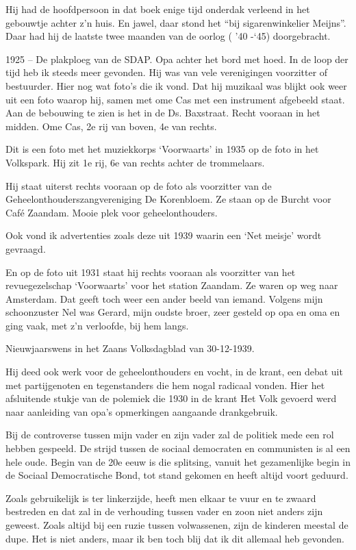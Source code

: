\documentclass[10pt,twoside,openright]{memoir}
\begin{document}
Hij had de hoofdpersoon in dat boek enige tijd onderdak verleend in het gebouwtje achter z’n huis. En jawel, daar stond het “bij sigarenwinkelier Meijns”. Daar had hij de laatste twee maanden van de oorlog ( ’40 -‘45) doorgebracht.

1925 – De plakploeg van de SDAP. Opa achter het bord met hoed.
In de loop der tijd heb ik steeds meer gevonden. Hij was van vele verenigingen voorzitter of bestuurder. Hier nog wat foto’s die ik vond. 
Dat hij muzikaal was blijkt ook weer uit een foto waarop hij, samen met ome Cas met een instrument afgebeeld staat. Aan de bebouwing te zien is het in de Ds. Baxstraat. Recht vooraan in het midden. Ome Cas, 2e rij van boven, 4e van rechts. 

Dit is een foto met het muziekkorps ‘Voorwaarts’ in 1935 op de foto in het Volkspark. Hij zit 1e rij, 6e van rechts achter de trommelaars.

Hij staat uiterst rechts vooraan op de foto als voorzitter van de Geheelonthouderszangvereniging De Korenbloem. Ze staan op de Burcht voor Café Zaandam. Mooie plek voor geheelonthouders.

Ook vond ik advertenties zoals deze uit 1939 waarin 
een ‘Net meisje’ wordt gevraagd.

En op de foto uit 1931 staat hij rechts vooraan als voorzitter van het revuegezelschap ‘Voorwaarts’ voor het station Zaandam. Ze waren op weg naar Amsterdam. Dat geeft toch weer een ander beeld van iemand. Volgens mijn schoonzuster Nel was Gerard, mijn oudste broer, zeer gesteld op opa en oma en ging vaak, met z’n verloofde, bij hem langs. 

Nieuwjaarswens in het Zaans Volksdagblad van 30-12-1939.

Hij deed ook werk voor de geheelonthouders en vocht, in de krant, een debat uit met partijgenoten en tegenstanders die hem nogal radicaal vonden. Hier het afsluitende stukje van de polemiek die 1930 in de krant Het Volk gevoerd werd naar aanleiding van opa’s opmerkingen aangaande drankgebruik. 

Bij de controverse tussen mijn vader en zijn vader zal de politiek mede een rol hebben gespeeld. De strijd tussen de sociaal democraten en communisten is al een hele oude. Begin van de 20e eeuw is die splitsing, vanuit het gezamenlijke begin in de Sociaal Democratische Bond, tot stand gekomen en heeft altijd voort geduurd. 

Zoals gebruikelijk is ter linkerzijde, heeft men elkaar te vuur en te zwaard bestreden en dat zal in de verhouding tussen vader en zoon niet anders zijn geweest. Zoals altijd bij een ruzie tussen volwassenen, zijn de kinderen meestal de dupe. Het is niet anders, maar ik ben toch blij dat ik dit allemaal heb gevonden.
\end{document}
